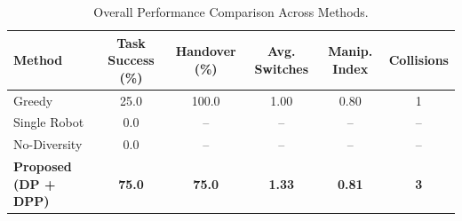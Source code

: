 
\begin{table}[t]
\centering
\caption{Overall Performance Comparison Across Methods.}
\label{tab:quantitative}
\begin{tabular}{lccccc}
\hline
\textbf{Method} & 
\textbf{Task Success (\%)} & 
\textbf{Handover (\%)} & 
\textbf{Avg. Switches} & 
\textbf{Manip. Index} & 
\textbf{Collisions} \\
\hline

Greedy 
& 25.0 
& 100.0 
& 1.00 
& 0.80 
& 1 \\

Single Robot 
& 0.0 
& -- 
& --
& -- 
& -- \\

No-Diversity 
& 0.0 
& -- 
& -- 
& -- 
& -- \\

\textbf{Proposed (DP + DPP)} 
& \textbf{75.0} 
& \textbf{75.0} 
& \textbf{1.33} 
& \textbf{0.81} 
& \textbf{3} \\
\hline
\end{tabular}
\end{table}
